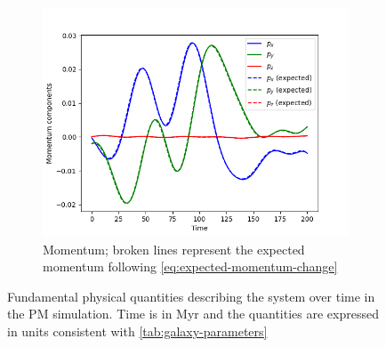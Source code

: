 \begin{figure}[htp]
    \vspace{0.5cm}

    \begin{subfigure}[b]{0.45\textwidth}
        \centering
        \includegraphics[width=\textwidth]{img/pm/momentum.png}
        \caption{Momentum; broken lines represent the expected momentum following \autoref{eq:expected-momentum-change}}
        \label{fig:physical-quantities-pm-sub3}
    \end{subfigure}

    \caption{Fundamental physical quantities describing the system over time in the PM simulation.
        Time is in Myr and the quantities are expressed in units consistent with \autoref{tab:galaxy-parameters}}
    \label{fig:physical-quantities-pm}
\end{figure}

